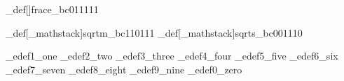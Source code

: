
\brl@char_def[]{frace}{\brl@char_bc011111}







\brl@char_def[\brl@char_mathstack{}{}]{sqrtm}{\brl@char_bc110111}
\brl@char_def[\brl@char_mathstack{}{}]{sqrts}{\brl@char_bc001110}



\brl@char_edef{1}{\brl@char@alias_one}
\brl@char_edef{2}{\brl@char@alias_two}
\brl@char_edef{3}{\brl@char@alias_three}
\brl@char_edef{4}{\brl@char@alias_four}
\brl@char_edef{5}{\brl@char@alias_five}
\brl@char_edef{6}{\brl@char@alias_six}
\brl@char_edef{7}{\brl@char@alias_seven}
\brl@char_edef{8}{\brl@char@alias_eight}
\brl@char_edef{9}{\brl@char@alias_nine}
\brl@char_edef{0}{\brl@char@alias_zero}




